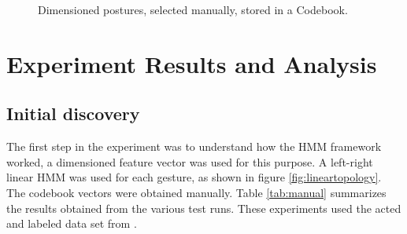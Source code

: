 \documentclass[]{report}   %
\begin{document}
\begin{figure}[htbp]
  \hfill
  \hfill
  \hfill  
  \caption{Dimensioned postures, selected manually, stored in a Codebook.}
  \label{fig:codebook1}
\end{figure}

\chapter{Experiment Results and Analysis}\label{sec:results}
\section{Initial discovery}
The first step in the experiment was to understand how the HMM framework worked, a dimensioned feature vector was used for this purpose. A left-right linear HMM was used for each gesture, as shown in figure \ref{fig:lineartopology}. The codebook vectors were obtained manually. Table \ref{tab:manual} summarizes the results obtained from the various test runs. These experiments used the acted and labeled data set from \citet{Kleinsmith:2006:CDR:1221613.1222203}.
\end{document}
